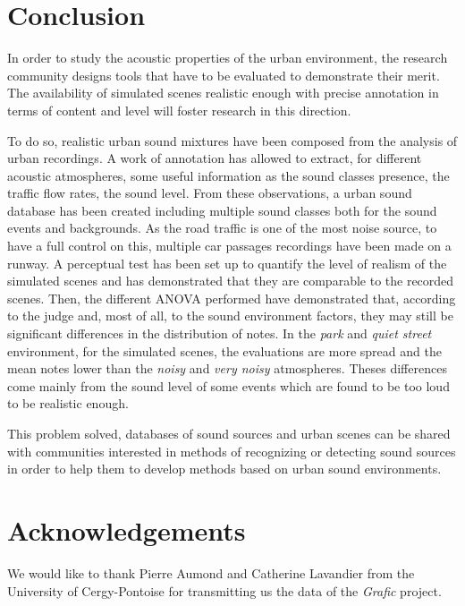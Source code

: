 \documentclass[11pt,letter]{article}
\begin{document}
\section{Conclusion}

In order to study the acoustic properties of the urban environment, the research community designs tools that have to be evaluated to demonstrate their merit. The availability of simulated scenes realistic enough with precise annotation in terms of content and level will foster research in this direction.

To do so, realistic urban sound mixtures have been composed from the analysis of urban recordings. A work of annotation has allowed to extract, for different acoustic atmospheres, some useful information as the sound classes presence, the traffic flow rates, the sound level. From these observations, a urban sound database has been created including multiple sound classes both for the sound events and backgrounds. As the road traffic is one of the most noise source, to have a full control on this, multiple car passages recordings have been made on a runway. A perceptual test has been set up to quantify the level of realism of the simulated scenes and has demonstrated that they are comparable to the recorded scenes. Then, the different ANOVA performed have demonstrated that, according to the judge and, most of all, to the sound environment factors, they may still be significant differences in the distribution of notes. In the \textit{park} and \textit{quiet street} environment, for the simulated scenes, the evaluations are more spread and the mean notes lower than the \textit{noisy} and \textit{very noisy} atmospheres. Theses differences come mainly from the sound level of some events which are found to be too loud to be realistic enough.

This problem solved, databases of sound sources and urban scenes can be shared with communities interested in methods of recognizing or detecting sound sources in order to help them to develop methods based on urban sound environments.

\section{Acknowledgements}
We would like to thank Pierre Aumond and Catherine Lavandier from the University of Cergy-Pontoise for transmitting us the data of the \textit{Grafic} project.



\end{document}
